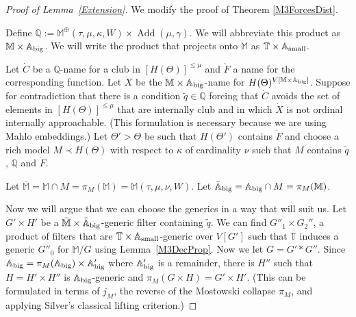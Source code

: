 \documentclass[a4paper]{amsart}
\theoremstyle{definition}
\theoremstyle{remark}
\theoremstyle{plain}
\newtheorem{myfact}[mydef]{Fact}
\numberwithin{mydef}{section}
\DeclareMathOperator{\Add}{Add}
\newcommand{\dA}{\mathbb{A}}
\newcommand{\dM}{\mathbb{M}}
\newcommand{\dP}{\mathbb{P}}
\newcommand{\dQ}{\mathbb{Q}}
\newcommand{\dT}{\mathbb{T}}
\begin{document}
	\begin{proof}[Proof of Lemma~\ref{Extension}]
		We modify the proof of Theorem \ref{M3ForcesDist}.
		
		Define $\dQ:=\dM^\oplus(\tau,\mu,\kappa,W)\times\Add(\mu,\gamma)$. We will abbreviate this product as $\dM \times \dA_\textup{big}$. We will write the product that projects onto $\dM$ as $\dT \times \dA_\textup{small}$.
		
		 Let $\dot{C}$ be a $\dQ$-name for a club in $[H(\Theta)]^{\leq\mu}$ and $\dot{F}$ a name for the corresponding function. Let $\dot{X}$ be the $\dM \times \dA_\textup{big}$-name for $H(\Theta)^{V[\dM \times \dA_\textup{big}]}$. Suppose for contradiction that there is a condition $\tilde{q} \in \dQ$ forcing that $\dot{C}$ avoids the set of elements in $[H(\Theta)]^{\leq\mu}$ that are internally club and in which $\dot{X}$ is not ordinal internally approachable. (This formulation is necessary because we are using Mahlo embeddings.) Let $\Theta'>\Theta$ be such that $H(\Theta')$ contains $\dot{F}$ and choose a rich model $M\prec H(\Theta)$ with respect to $\kappa$ of cardinality $\nu$ such that $M$ contains $\tilde{q}$, $\dQ$ and $\dot{F}$.
		 
		 Let $\bar{\dM} = \dM \cap M = \pi_M(\dM)= \dM(\tau,\mu,\nu,W)$. Let $\bar{\mathbb{A}}_\textup{big} = \mathbb{A}_\textup{big} \cap M = \pi_M(\dM)$.
		 
		Now we will argue that we can choose the generics in a way that will suit us. Let $G' \times H'$ be a $\bar{\dM} \times \bar{\dA}_\textup{big}$-generic filter containing $\tilde{q}$. We can find $G''_1 \times G_2''$, a product of filters that are $\dT \times \mathbb{A}_\textup{small}$-generic over $V[G']$ such that $\dT$ induces a generic $G''_0$ for $\dM/G$ using Lemma~\ref{M3DecProp}. Now we let $G = G' \ast G''$. Since $\mathbb{A}_\textup{big} = \pi_M(\mathbb{A}_\textup{big}) \times \mathbb{A}'_\textup{big}$ where $\mathbb{A}'_\textup{big}$ is a remainder, there is $H''$ such that $H=H' \times H''$ is $\mathbb{A}_\textup{big}$-generic and $\pi_M(G \times H) = G' \times H'$. (This can be formulated in terms of $j_M$, the reverse of the Mostowski collapse $\pi_M$, and applying Silver's classical lifting criterion.)
		 
		  

\end{proof}
\end{document}
